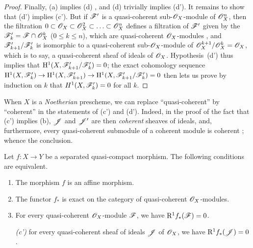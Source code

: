 \begin{proof}
Finally, (a) implies (d) , and (d) trivially implies (d').
It remains to show that (d') implies (c').
But if $\mathscr{F}'$ is a quasi-coherent sub-$\mathscr{O}_X$-module of $\mathscr{O}_X^n$, then the filtration $0\subset\mathscr{O}_X\subset\mathscr{O}_X^2\subset\ldots\subset\mathscr{O}_X^n$ defines a filtration of $\mathscr{F}'$ given by the $\mathscr{F}'_k=\mathscr{F}\cap\mathscr{O}_X^k$ ($0\leq k\leq n$), which are quasi-coherent $\mathscr{O}_X$-modules , and $\mathscr{F}'_{k+1}/\mathscr{F}'_k$ is isomorphic to a quasi-coherent sub-$\mathscr{O}_X$-module of $\mathscr{O}_X^{k+1}/\mathscr{O}_X^k=\mathscr{O}_X$, which is to say, a quasi-coherent sheaf of ideals of $\mathscr{O}_X$.
Hypothesis~(d') thus implies that $\mathrm{H}^1(X,\mathscr{F}'_{k+1}/\mathscr{F}'_k)=0$;
the exact cohomology sequence $\HH^1(X,\sh{F}'_k)\to\HH^1(X,\sh{F}'_{k+1})\to\HH^1(X,\sh{F}'_{k+1}/\sh{F}'_k)=0$ then lets us prove by induction on $k$ that $H^1(X,\mathscr{F}'_k)=0$ for all $k$.
\end{proof}

\begin{rmk}[5.2.1.1]
\label{2.5.2.1.1}
When $X$ is a \emph{Noetherian} prescheme, we can replace ``quasi-coherent'' by ``coherent'' in the statements of (c') and (d').
Indeed, in the proof of the fact that (c') implies (b), $\mathscr{J}$ and $\mathscr{J}'$ are then \emph{coherent} sheaves of ideals, and, furthermore, every quasi-coherent submodule of a coherent module is coherent ;
whence the conclusion.
\end{rmk}

\begin{cor}[5.2.2]
\label{2.5.2.2}
Let $f:X\to Y$ be a separated quasi-compact morphism.
The following conditions are equivalent.
\begin{enumerate}[label=\emph{(\alph*)}]
  \item The morphism $f$ is an affine morphism.
  \item The functor $f_*$ is exact on the category of quasi-coherent $\mathscr{O}_X$-modules.
  \item For every quasi-coherent $\mathscr{O}_X$-module $\mathscr{F}$, we have $\mathrm{R}^1 f_*(\mathscr{F})=0$.
  \item[\emph{(c')}] for every quasi-coherent sheaf of ideals $\mathscr{J}$ of $\mathscr{O}_X$, we have $\mathrm{R}^1 f_*(\mathscr{J})=0$.
\end{enumerate}
\end{cor}

